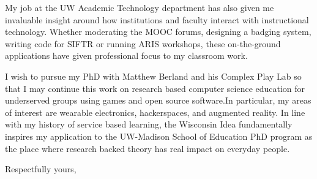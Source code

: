 \documentclass[12pt]{letter}
\newcommand{\ignore}[2]{\hspace{0in}#2} %
\begin{document}
\begin{letter}
My job at the UW Academic Technology department has also given me invaluable insight around how institutions and faculty interact with instructional technology. Whether \ignore{am I using 'whether' too much?} moderating the MOOC forums, designing a badging system, writing code for SIFTR or running ARIS workshops, these on-the-ground applications have given professional focus to my classroom work.

I wish to pursue my PhD with Matthew Berland and his Complex Play Lab so that I may continue this work on research based computer science education for underserved groups using games and open source software.\ignore{am I repeating myself?} In particular, my areas of interest are wearable electronics, hackerspaces, and augmented reality. In line with my history of service based learning, the Wisconsin Idea fundamentally inspires my application to the UW-Madison School of Education PhD program as the place where research backed theory has real impact on everyday people. \ignore{something optimistic and concludy needed here}

\closing{Respectfully yours,}

\end{letter}
\end{document}
